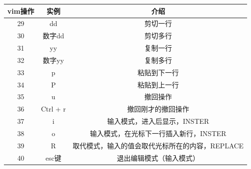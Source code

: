 \documentclass[a4paper, 12pt]{article}
\begin{document}
		\begin{tabular}{|c|c|c|}
		\hline
		vim操作 & 实例   & 介绍 \\
		\hline
		29 & dd   & 剪切一行 \\
		\hline
		30 & 数字dd   &   剪切多行   \\
		\hline
		31 & yy & 复制一行 \\
		\hline
		32 & 数字yy & 复制多行 \\
		\hline
		33 & p   & 粘贴到下一行 \\
		\hline
		34 & P & 粘贴到上一行 \\
		\hline
		35 & u   & 撤回操作 \\
		\hline
		36 & Ctrl + r   &  撤回刚才的撤回操作   \\
		\hline
		37 & i & 输入模式，进入后显示，INSTER \\
		\hline
		38& o & 输入模式，在光标下一行插入新行，INSTER\\
		\hline
		39 & R &取代模式，输入的值会取代光标所在的内容，REPLACE\\
		\hline
		40 & esc键  & 退出编辑模式（输入模式） \\
		\hline
	\end{tabular}
\end{document}
